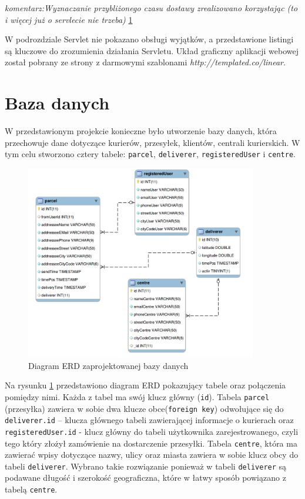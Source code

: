 \documentclass[eng,printmode,oneside]{mgr}
\begin{document}
\emph{\color{komentarz}komentarz:Wyznaczanie przybliżonego czasu dostawy
zrealizowano korzystając (to i więcej już o servlecie nie trzeba)}
\ref{}

W podrozdziale Servlet nie pokazano obsługi wyjątków, a przedstawione listingi
są kluczowe do zrozumienia działania Servletu. Układ graficzny aplikacji webowej
został pobrany ze strony z darmowymi szablonami
{\textit{http://templated.co/linear}}.

\newpage
\section{Baza danych}

W przedstawionym projekcie konieczne było utworzenie bazy danych, która
przechowuje dane dotyczące kurierów, przesyłek, klientów, centrali kurierskich.
W tym celu stworzono cztery tabele: \texttt{parcel}, \texttt{deliverer},
\texttt{registeredUser} i \texttt{centre}.

\begin{figure}[ht!]
\centering
\includegraphics[width=0.9\textwidth]{ERD.png}
\caption{Diagram ERD zaprojektowanej bazy danych}
\label{fig:ERD}
\end{figure}

Na rysunku \ref{fig:ERD} przedstawiono diagram ERD pokazujący tabele oraz
połączenia pomiędzy nimi. Każda z tabel ma swój klucz główny (\texttt{id}).
Tabela \texttt{parcel} (przesyłka) zawiera w sobie dwa klucze obce(\texttt{foreign
key}) odwołujące się do \texttt{deliverer.id} -- klucza głównego
tabeli zawierającej informacje o kurierach oraz \texttt{registeredUser.id} -
klucz główny do tabeli użytkownika zarejestrowanego, czyli tego który złożył
zamówienie na dostarczenie przesyłki. Tabela \texttt{centre}, która ma zawierać
wpisy dotyczące nazwy, ulicy oraz miasta zawiera w sobie klucz obcy do tabeli
\texttt{deliverer}. Wybrano takie rozwiązanie ponieważ w tabeli
\texttt{deliverer} są podawane długość i szerokość geograficzna, które w łatwy sposób powiązano z tabelą \texttt{centre}.
\end{document}
